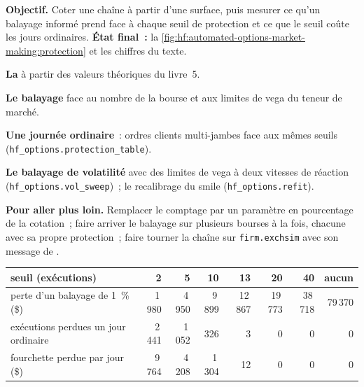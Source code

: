 \begin{tutorial}
\textbf{Objectif.} Coter une chaîne à partir d'une surface, puis mesurer ce qu'un balayage informé prend face à chaque seuil de protection et ce que le seuil
coûte les jours ordinaires. \textbf{État final~:} la \cref{fig:hf:automated-options-market-making:protection} et les chiffres du texte.
\begin{tutsteps}
\item \textbf{La } à partir des valeurs théoriques du livre~5.
\label{lst:hf:automated-options-market-making:quote}
\item \textbf{Le balayage} face au nombre de la bourse et aux limites de vega du teneur de marché.
\label{lst:hf:automated-options-market-making:sweep}
\item \textbf{Une journée ordinaire}~: ordres clients multi-jambes face aux mêmes seuils (\texttt{hf\_options.protection\_table}).
\item \textbf{Le balayage de volatilité} avec des limites de vega à deux vitesses de réaction (\texttt{hf\_options.vol\_sweep})~; le recalibrage du smile
(\texttt{hf\_options.refit}).
\end{tutsteps}
\textbf{Pour aller plus loin.} Remplacer le comptage par un paramètre en pourcentage de la cotation~; faire arriver le balayage sur plusieurs bourses à la fois, chacune avec
sa propre protection~; faire tourner la chaîne sur \texttt{firm.exchsim} avec son message de .
\end{tutorial}

\begin{center}
\small
\begin{tabular}{@{}lrrrrrrr@{}}
\toprule
seuil (exécutions) & 2 & 5 & 10 & 13 & 20 & 40 & aucun\\
\midrule
perte d'un balayage de 1~\% (\$) & 1\,980 & 4\,950 & 9\,899 & 12\,867 & 19\,773 & 38\,718 & 79\,370\\
exécutions perdues un jour ordinaire & 2\,441 & 1\,052 & 326 & 3 & 0 & 0 & 0\\
fourchette perdue par jour (\$) & 9\,764 & 4\,208 & 1\,304 & 12 & 0 & 0 & 0\\
\bottomrule
\end{tabular}
\end{center}

